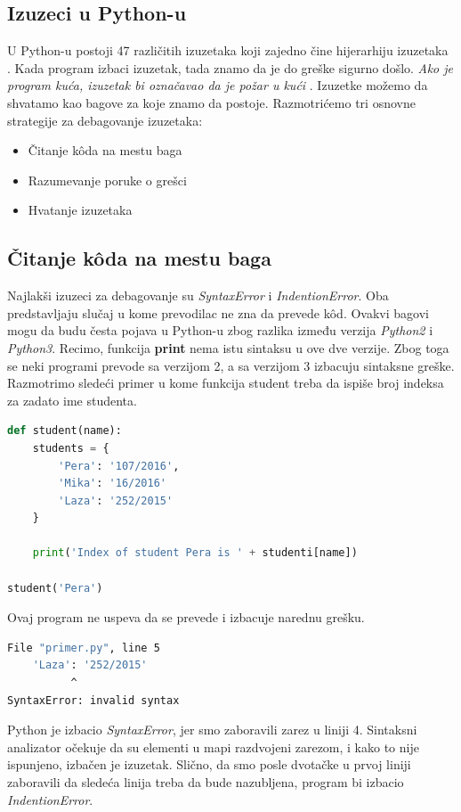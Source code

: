 \documentclass[a4paper]{article}
\begin{document}
\subsection{Izuzeci u Python-u}
U Python-u postoji 47 različitih izuzetaka koji zajedno čine hijerarhiju izuzetaka \cite{excDocPyt}. Kada program izbaci izuzetak, tada znamo da je do greške sigurno došlo. \emph{Ako je program kuća, izuzetak bi označavao da je požar u kući} \cite{proPyDeb}. Izuzetke možemo da shvatamo kao bagove za koje znamo da postoje. Razmotrićemo tri osnovne strategije za debagovanje izuzetaka:
\begin{itemize}
\item Čitanje k\^{o}da na mestu baga
\item Razumevanje poruke o grešci
\item Hvatanje izuzetaka
\end{itemize}
\subsection{Čitanje k\^{o}da na mestu baga}
Najlakši izuzeci za debagovanje su \emph{SyntaxError} i \emph{IndentionError}. Oba predstavljaju slučaj u kome prevodilac ne zna da prevede k\^{o}d. Ovakvi bagovi mogu da budu česta pojava u Python-u zbog razlika između verzija \emph{Python2} i \emph{Python3}. Recimo, funkcija \textbf{print} nema istu sintaksu u ove dve verzije. Zbog toga se neki programi prevode sa verzijom 2, a sa verzijom 3 izbacuju sintaksne greške. Razmotrimo sledeći primer u kome funkcija student treba da ispiše broj indeksa za zadato ime studenta.
\begin{lstlisting}[language = Python, caption={Funkcija student ispisuje broj indeksa za zadato ime studenta}]
def student(name):
    students = {
        'Pera': '107/2016',
        'Mika': '16/2016'
        'Laza': '252/2015'
    }

    print('Index of student Pera is ' + studenti[name])

student('Pera')
\end{lstlisting}
Ovaj program ne uspeva da se prevede i izbacuje narednu grešku.
\begin{lstlisting}[language = bash, caption={Ispis iz konzole za prethodni primer}]
  File "primer.py", line 5
    'Laza': '252/2015'
          ^
SyntaxError: invalid syntax
\end{lstlisting}

Python je izbacio \emph{SyntaxError}, jer smo zaboravili zarez u liniji 4. Sintaksni analizator očekuje da su elementi u mapi razdvojeni zarezom, i kako to nije ispunjeno, izbačen je izuzetak. Slično, da smo posle dvotačke u prvoj liniji zaboravili da sledeća linija treba da bude nazubljena, program bi izbacio \emph{IndentionError}.
\end{document}
